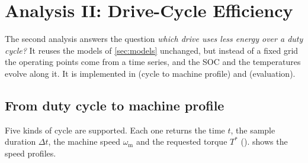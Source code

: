 \section{Analysis II: Drive-Cycle Efficiency}\label{sec:cycles}
The second analysis answers the question \emph{which drive uses less energy over a duty cycle?} It reuses the models of \cref{sec:models} unchanged, but instead of a fixed grid the operating points come from a time series, and the SOC and the temperatures evolve along it. It is implemented in  (cycle to machine profile) and  (evaluation).

\subsection{From duty cycle to machine profile}\label{sec:profile}
Five kinds of cycle are supported. Each one returns the time $t$, the sample duration $\Delta t$, the machine speed $\omega_\mathrm{m}$ and the requested torque $T^*$ ().  shows the speed profiles.

